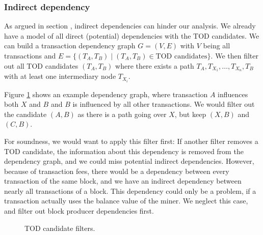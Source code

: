 \documentclass[draft,final]{vutinfth} %
\begin{document}

\subsubsection{Indirect dependency}

\iffalse
    The overall goal of our analysis, is to analyze the effects of the transaction order. For this, we will take a TOD candidate $(T_A, T_B)$ and analyze what would have happened if they were executed in the opposite order, i.e. $(T_B, T_A)$.
\fi

As argued in section , indirect dependencies can hinder our analysis. We already have a model of all direct (potential) dependencies with the TOD candidates. We can build a transaction dependency graph $G = (V, E)$ with $V$ being all transactions and $E = \{ (T_A, T_B) \mid (T_A, T_B) \in \text{TOD candidates} \}$. We then filter out all TOD candidates $(T_A, T_B)$ where there exists a path $T_A, T_{X_1}, \dots, T_{X_n}, T_B$ with at least one intermediary node $T_{X_i}$.

Figure \ref{fig:tod_candidate_dependency} shows an example dependency graph, where transaction $A$ influences both $X$ and $B$ and $B$ is influenced by all other transactions. We would filter out the candidate $(A, B)$ as there is a path going over $X$, but keep $(X, B)$ and $(C, B)$.

For soundness, we would want to apply this filter first: If another filter removes a TOD candidate, the information about this dependency is removed from the dependency graph, and we could miss potential indirect dependencies. However, because of transaction fees, there would be a dependency between every transaction of the same block, and we have an indirect dependency between nearly all transactions of a block. This dependency could only be a problem, if a transaction actually uses the balance value of the miner. We neglect this case, and filter out block producer dependencies first.

\begin{figure}[h]
    \centering
    \caption{TOD candidate filters.}
    \label{fig:tod_candidate_dependency}
\end{figure}
\end{document}

